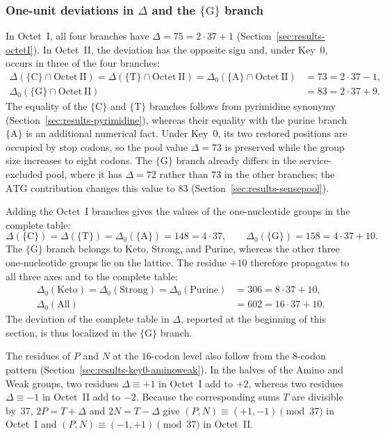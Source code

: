 \documentclass[11pt,a4paper]{article}
\renewcommand{\_}{\origunderscore\allowbreak}
\begin{document}
\subsubsection{One-unit deviations in
\texorpdfstring{$\Delta$}{Delta} and the
\texorpdfstring{$\{\mathrm{G}\}$}{G} branch}
\label{sec:results-key0-delta}

In Octet~I, all four branches have
$\Delta=75=2\cdot37+1$
(Section~\ref{sec:results-octetI}). In Octet~II, the deviation has
the opposite sign and, under Key~0, occurs in three of the four
branches:
\[
\begin{aligned}
\Delta(\{\mathrm{C}\}\cap\mathrm{Octet~II})
  =\Delta(\{\mathrm{T}\}\cap\mathrm{Octet~II})
  =\Delta_{0}(\{\mathrm{A}\}\cap\mathrm{Octet~II})
  &=73=2\cdot37-1, \\
\Delta_{0}(\{\mathrm{G}\}\cap\mathrm{Octet~II})
  &=83=2\cdot37+9.
\end{aligned}
\]
The equality of the $\{\mathrm{C}\}$ and $\{\mathrm{T}\}$ branches
follows from pyrimidine synonymy
(Section~\ref{sec:results-pyrimidine}), whereas their equality with
the purine branch $\{\mathrm{A}\}$ is an additional numerical fact.
Under Key~0, its two restored positions are occupied by stop codons,
so the pool value $\Delta=73$ is preserved while the group size
increases to eight codons. The $\{\mathrm{G}\}$ branch already
differs in the service-excluded pool, where it has $\Delta=72$
rather than $73$ in the other branches; the $\mathrm{ATG}$
contribution changes this value to $83$
(Section~\ref{sec:results-sensepool}).

Adding the Octet~I branches gives the values of the one-nucleotide
groups in the complete table:
\[
\Delta(\{\mathrm{C}\})=\Delta(\{\mathrm{T}\})
  =\Delta_{0}(\{\mathrm{A}\})=148=4\cdot37,
\qquad
\Delta_{0}(\{\mathrm{G}\})=158=4\cdot37+10.
\]
The $\{\mathrm{G}\}$ branch belongs to Keto, Strong, and Purine,
whereas the other three one-nucleotide groups lie on the lattice.
The residue $+10$ therefore propagates to all three axes and to the
complete table:
\[
\begin{aligned}
\Delta_{0}(\mathrm{Keto})
  =\Delta_{0}(\mathrm{Strong})
  =\Delta_{0}(\mathrm{Purine})
  &=306=8\cdot37+10, \\
\Delta_{0}(\mathrm{All})
  &=602=16\cdot37+10.
\end{aligned}
\]
The deviation of the complete table in $\Delta$, reported at the
beginning of this section, is thus localized in the
$\{\mathrm{G}\}$ branch.

The residues of $P$ and $N$ at the $16$-codon level also follow from
the $8$-codon pattern
(Section~\ref{sec:results-key0-aminoweak}). In the halves of the
Amino and Weak groups, two residues $\Delta\equiv+1$ in Octet~I add
to $+2$, whereas two residues $\Delta\equiv-1$ in Octet~II add to
$-2$. Because the corresponding sums $T$ are divisible by~$37$,
$2P=T+\Delta$ and $2N=T-\Delta$ give
$(P,N)\equiv(+1,-1)\pmod{37}$ in Octet~I and
$(P,N)\equiv(-1,+1)\pmod{37}$ in Octet~II.
\end{document}
